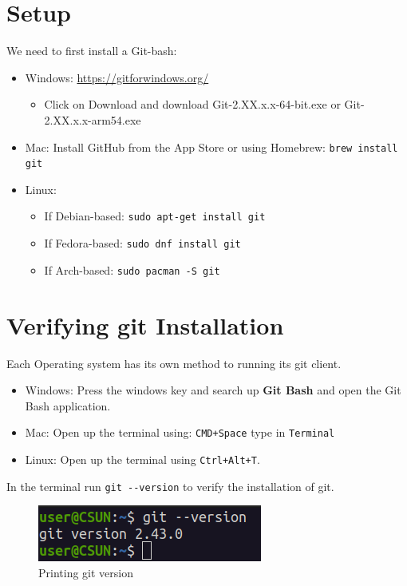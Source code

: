 \documentclass[12pt, a4paper]{article}
\begin{document}
\section{Setup}
We need to first install a Git-bash:\\

\begin{itemize}
    \item Windows: \url{https://gitforwindows.org/}
	\begin{itemize}
		\item Click on Download and download Git-2.XX.x.x-64-bit.exe or Git-2.XX.x.x-arm54.exe
		\end{itemize}

    \item Mac: Install GitHub from the App Store or using Homebrew:
\verb+brew install git+\\
\item Linux:
    \begin{itemize}
        \item If Debian-based: \verb+sudo apt-get install git+ \\
        \item If Fedora-based: \verb+sudo dnf install git+\\
        \item If Arch-based: \verb+sudo pacman -S git+ 
    \end{itemize}
\end{itemize}

\section{Verifying git Installation}

Each Operating system has its own method to running its git client. 
\begin{itemize}
\item Windows: Press the windows key and search up \textbf{Git Bash} and open the Git Bash application.
\item Mac: Open up the terminal using: \texttt{CMD+Space} type in \texttt{Terminal}
\item Linux: Open up the terminal using \texttt{Ctrl+Alt+T}.
\end{itemize}

In the terminal run \verb+git --version+ to verify the installation of git.
\begin{figure}[H]
\centering
\includegraphics[scale=0.75]{../images/workshop-I/git-ver.png}
\caption{Printing git version}
\end{figure}
\end{document}
